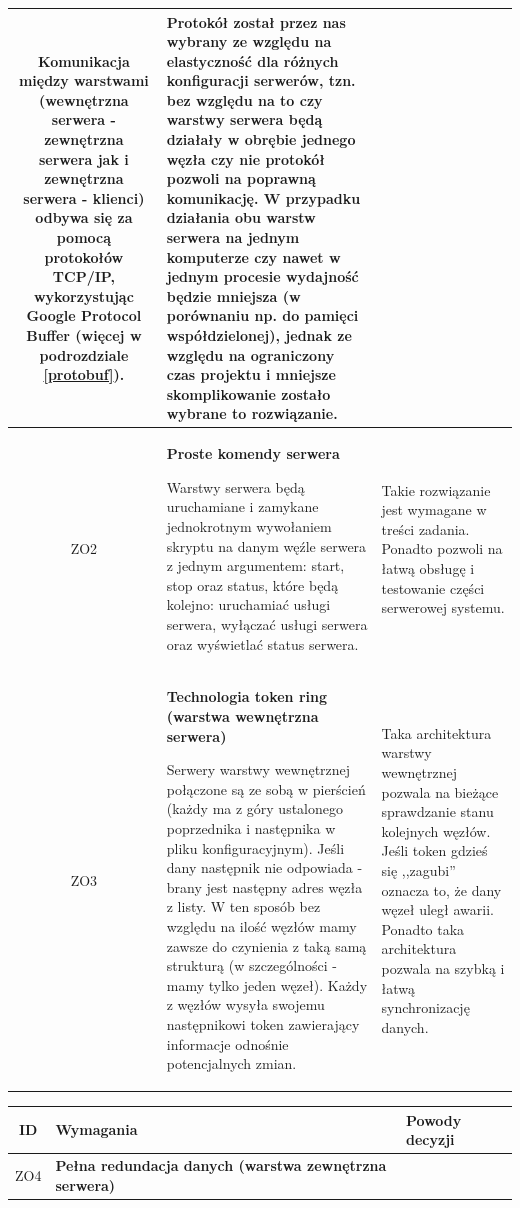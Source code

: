 {\begin{tabularx}{\textwidth}{|c|X|X|}
Komunikacja między warstwami (wewnętrzna serwera - zewnętrzna serwera jak i zewnętrzna serwera - klienci) odbywa się za pomocą protokołów TCP/IP, wykorzystując Google Protocol Buffer (więcej w podrozdziale \ref{protobuf}). & 
Protokół został przez nas wybrany ze względu na elastyczność dla różnych konfiguracji serwerów, tzn. bez względu na to czy warstwy serwera będą działały w obrębie jednego węzła czy nie protokół pozwoli na poprawną komunikację. W przypadku działania obu warstw serwera na jednym komputerze czy nawet w jednym procesie wydajność będzie mniejsza (w porównaniu np. do pamięci współdzielonej), jednak ze względu na ograniczony czas projektu i mniejsze skomplikowanie zostało wybrane to rozwiązanie. \\
\hline

\label{z:ZO2} ZO2 &  \textbf{Proste komendy serwera}

Warstwy serwera będą uruchamiane i zamykane jednokrotnym wywołaniem skryptu na danym węźle serwera z jednym argumentem: start, stop oraz status, które będą kolejno: uruchamiać usługi serwera, wyłączać usługi serwera oraz wyświetlać status serwera. & 
Takie rozwiązanie jest wymagane w treści zadania. Ponadto pozwoli na łatwą obsługę i testowanie części serwerowej systemu. \\
\hline

\label{z:ZO3} ZO3 &  \textbf{Technologia token ring (warstwa wewnętrzna serwera)}

Serwery warstwy wewnętrznej połączone są ze sobą w pierścień (każdy ma z góry ustalonego poprzednika i następnika w pliku konfiguracyjnym). Jeśli dany następnik nie odpowiada - brany jest następny adres węzła z listy. W ten sposób bez względu na ilość węzłów mamy zawsze do czynienia z taką samą strukturą (w szczególności - mamy tylko jeden węzeł). Każdy z węzłów wysyła swojemu następnikowi token zawierający informacje odnośnie potencjalnych zmian. & 
Taka architektura warstwy wewnętrznej pozwala na bieżące sprawdzanie stanu kolejnych węzłów. Jeśli token gdzieś się ,,zagubi'' oznacza to, że dany węzeł uległ awarii. Ponadto taka architektura pozwala na szybką i łatwą synchronizację danych. \\
\hline

\end{tabularx}

\pagebreak

\begin{tabularx}{\textwidth}{|c|X|X|}
\hline
\textbf{ID} & \textbf{Wymagania}  & \textbf{Powody decyzji} \\
\hline
\label{z:ZO4} ZO4 &  \textbf{Pełna redundacja danych (warstwa zewnętrzna serwera)}


\end{tabularx}}
